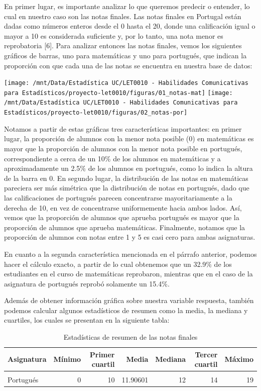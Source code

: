 \documentclass[
]{article}
\begin{document}
En primer lugar, es importante analizar lo que queremos predecir o
entender, lo cual en nuestro caso son las notas finales. Las notas
finales en Portugal están dadas como números enteros desde el 0 hasta el
20, donde una calificación igual o mayor a 10 es considerada suficiente
y, por lo tanto, una nota menor es reprobatoria {[}6{]}. Para analizar
entonces las notas finales, vemos los siguientes gráficos de barras, uno
para matemáticas y uno para portugués, que indican la proporción con que
cada una de las notas se encuentra en nuestra base de datos:

\texttt{[image: /mnt/Data/Estadística UC/LET0010 - Habilidades Comunicativas para Estadísticos/proyecto-let0010/figuras/01\_notas-mat]}
\texttt{[image: /mnt/Data/Estadística UC/LET0010 - Habilidades Comunicativas para Estadísticos/proyecto-let0010/figuras/02\_notas-por]}

Notamos a partir de estas gráficas tres características importantes: en
primer lugar, la proporción de alumnos con la menor nota posible (0) en
matemáticas es mayor que la proporción de alumnos con la menor nota
posible en portugués, correspondiente a cerca de un 10\% de los alumnos
en matemáticas y a aproximadamente un 2.5\% de los alumnos en portugués,
como lo indica la altura de la barra en 0. En segundo lugar, la
distribución de las notas en matemáticas pareciera ser más simétrica que
la distribución de notas en portugués, dado que las calificaciones de
portugués parecen concentrarse mayoritariamente a la derecha de 10, en
vez de concentrarse uniformemente hacia ambos lados. Así, vemos que la
proporción de alumnos que aprueba portugués es mayor que la proporción
de alumnos que aprueba matemáticas. Finalmente, notamos que la
proporción de alumnos con notas entre 1 y 5 es casi cero para ambas
asignaturas.

En cuanto a la segunda característica mencionada en el párrafo anterior,
podemos hacer el cálculo exacto, a partir de lo cual obtenemos que un
32.9\% de los estudiantes en el curso de matemáticas reprobaron,
mientras que en el caso de la asignatura de portugués reprobó solamente
un 15.4\%.

Además de obtener información gráfica sobre nuestra variable respuesta,
también podemos calcular algunos estadísticos de resumen como la media,
la mediana y cuartiles, los cuales se presentan en la siguiente tabla:

\begin{longtable}[t]{lrrrrrr}
\caption{\label{tab:tabla estadisticos promedio}Estadísticas de resumen de las notas finales}\\
\toprule
Asignatura & Mínimo & Primer cuartil & Media & Mediana & Tercer cuartil & Máximo\\
\midrule
\cellcolor{gray!6}{Matemáticas} & \cellcolor{gray!6}{0} & \cellcolor{gray!6}{8} & \cellcolor{gray!6}{10.41519} & \cellcolor{gray!6}{11} & \cellcolor{gray!6}{14} & \cellcolor{gray!6}{20}\\
Portugués & 0 & 10 & 11.90601 & 12 & 14 & 19\\
\bottomrule
\end{longtable}
\end{document}
